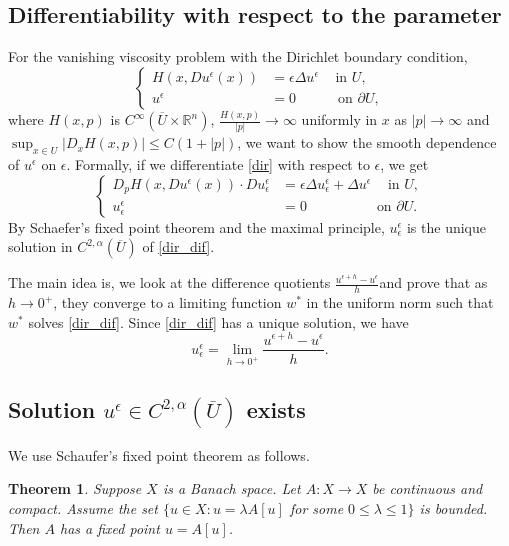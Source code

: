 \documentclass[11pt,reqno]{amsart}
\numberwithin{figure}{section}
\theoremstyle{plain}
\newtheorem{thm}{Theorem}[section]
\theoremstyle{remark}
\numberwithin{equation}{section}
\begin{document}
\begin{appendices}
\section{Differentiability with respect to the parameter}
For the vanishing viscosity problem with the Dirichlet boundary condition,
\begin{equation}
\label{dir}
\left\{
  \begin{aligned}
    H(x, Du^\epsilon(x)) &= \epsilon \Delta u^\epsilon \quad \, \text{in } U, \\
              u^\epsilon &= 0 \quad \qquad \text{on } \partial U,
  \end{aligned}
\right.
\end{equation}
where  $H(x,p)$ is $C^\infty(\overline{U}\times \mathbb{R}^n)$, $\displaystyle \frac{H(x,p)}{|p|} \to \infty$ uniformly in $x$ as $|p| \to \infty$ and $\displaystyle \sup_{x\in U}|D_xH(x,p)|\leq C(1+|p|)$, we want to show the smooth dependence of $u^\epsilon$ on $\epsilon$.
Formally, if we differentiate \eqref{dir} with respect to $\epsilon$, we get
\begin{equation}
\label{dir_dif}
\left\{
  \begin{aligned}
    D_pH(x, Du^\epsilon(x))\cdot Du^\epsilon_\epsilon &= \epsilon \Delta u^\epsilon_\epsilon +\Delta u^\epsilon \quad \, \text{in } U, \\
              u^\epsilon_\epsilon &= 0 \quad \qquad  \qquad  \text{on } \partial U.
  \end{aligned}
\right.
\end{equation}
By Schaefer's fixed point theorem and the maximal principle, $u^\epsilon_\epsilon$ is the unique solution in $C^{2,\alpha}(\overline{U})$ of \eqref{dir_dif}. 

The main idea is, we look at the difference quotients $\displaystyle \frac{u^{\epsilon+h}-u^\epsilon}{h}$and prove that as $h \to 0^+$, they converge to a limiting function $w^{\ast}$ in the uniform norm  such that $w^{\ast}$ solves \eqref{dir_dif}. Since \eqref{dir_dif} has a unique solution, we have $$u^\epsilon_\epsilon=\lim_{h \to 0^+}\frac{u^{\epsilon+h}-u^\epsilon}{h}.$$

\subsection{Solution $u^\epsilon \in C^{2,\alpha}(\overline{U})$ exists}
We use Schaufer's fixed point theorem as follows.

\begin{thm}
Suppose $X$ is a Banach space. Let $A:X \to X$ be continuous and compact. Assume the set $\{u\in X : u=\lambda A[u]$ for some $0 \leq  \lambda \leq 1\}$ is bounded. Then $A$ has a fixed point $u =A[u]$.
\end{thm}


\end{appendices}
\end{document}
